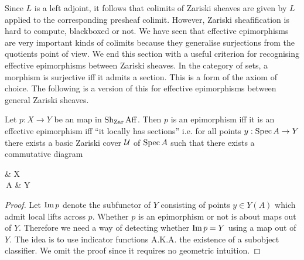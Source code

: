 \documentclass[./main.tex]{subfiles}
\begin{document}
Since $L$ is a left adjoint,
it follows that colimits of Zariski sheaves are
given by $L$ applied to the corresponding presheaf colimit.
However, Zariski sheafification is hard to compute,
blackboxed or not.
We have seen that effective epimorphisms
are very important kinds of colimits because they generalise
surjections from the quotients point of view.
We end this section with
a useful criterion for recognising
effective epimorphisms between Zariski sheaves.
In the category of sets,
a morphism is surjective iff it admits a section.
This is a form of the axiom of choice. 
The following is a version of this 
for effective epimorphisms between general Zariski sheaves.
\begin{prop}
  
  Let $p : X \to Y$ be an map in $\operatorname{Sh}_{\mathrm{Zar}} \mathrm{Aff}$.
  Then $p$ is an epimorphism iff it is an effective epimorphism 
  iff ``it locally has sections''
  i.e. for all points $y : \operatorname{Spec} A \to Y$
  there exists a basic Zariski cover $\mathcal{U}$ of $\operatorname{Spec} A$ such that
  there exists a commutative diagram
  \begin{cd}
    {} & X \\
    {\SPEC\,A} & Y
    \arrow["p", from=1-2, to=2-2]
    \arrow["y"', from=2-1, to=2-2]
    \arrow[from=1-1, to=2-1]
    \arrow["{\exists \,x}", dashed, from=1-1, to=1-2]
  \end{cd}
\end{prop}
\begin{proof}
  
  Let $\operatorname{Im} p$ denote the subfunctor of $Y$
  consisting of points $y \in Y(A)$ which admit local lifts across $p$.
  Whether $p$ is an epimorphism or not
  is about maps out of $Y$.
  Therefore we need a way of detecting whether $\operatorname{Im} p = Y$
  using a map out of $Y$.
  The idea is to use indicator functions A.K.A.
  the existence of a subobject classifier.
  We omit the proof since it requires no geometric intuition.





\end{proof}
\end{document}
